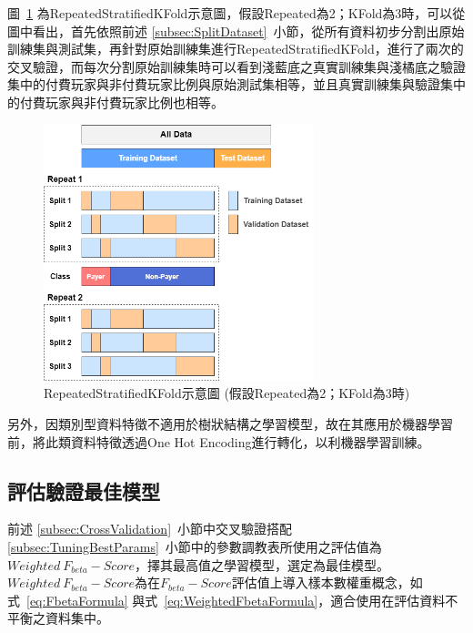 圖~\ref{fig:Image_RepeatedStratifiedKFold} 為RepeatedStratifiedKFold示意圖，假設Repeated為2；KFold為3時，可以從圖中看出，首先依照前述 \ref{subsec:SplitDataset}~小節，從所有資料初步分割出原始訓練集與測試集，再針對原始訓練集進行RepeatedStratifiedKFold，進行了兩次的交叉驗證，而每次分割原始訓練集時可以看到淺藍底之真實訓練集與淺橘底之驗證集中的付費玩家與非付費玩家比例與原始測試集相等，並且真實訓練集與驗證集中的付費玩家與非付費玩家比例也相等。

\begin{figure}[!htb]
  \begin{center}
    \includegraphics[width=0.7\textwidth]{figures/Image_RepeatedStratifiedKFold.png}
    \caption[RepeatedStratifiedKFold示意圖]{RepeatedStratifiedKFold示意圖 (假設Repeated為2；KFold為3時) }
    \label{fig:Image_RepeatedStratifiedKFold}
  \end{center}
\end{figure}

另外，因類別型資料特徵不適用於樹狀結構之學習模型，故在其應用於機器學習前，將此類資料特徵透過One Hot Encoding進行轉化，以利機器學習訓練。

\newpage

\subsection{評估驗證最佳模型}
\label{subsec:EvaluateBestModel}

前述 \ref{subsec:CrossValidation}~小節中交叉驗證搭配 \ref{subsec:TuningBestParams}~小節中的參數調教表所使用之評估值為$Weighted\ F_{beta} - Score$，擇其最高值之學習模型，選定為最佳模型。$Weighted\ F_{beta} - Score$為在$F_{beta} - Score$評估值上導入樣本數權重概念，如式~\ref{eq:FbetaFormula} 與式~\ref{eq:WeightedFbetaFormula}，適合使用在評估資料不平衡之資料集中。

